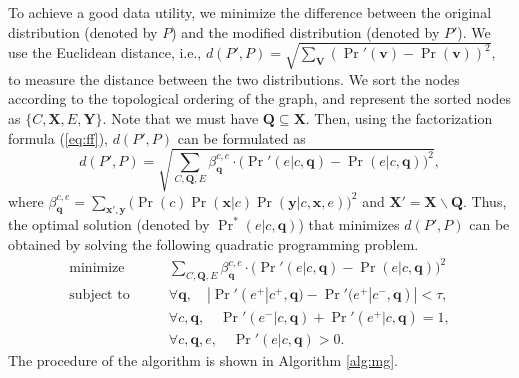 \documentclass[twoside,leqno,twocolumn]{article}
\begin{document}
To achieve a good data utility, we minimize the difference between the original distribution (denoted by $P$) and the modified distribution (denoted by $P'$). We use the Euclidean distance, i.e., $d(P',P)=\sqrt{\sum_{\mathbf{V}}({\Pr}'(\mathbf{v})-\Pr(\mathbf{v}))^{2}}$, to measure the distance between the two distributions. We sort the nodes according to the topological ordering of the graph, and represent the sorted nodes as $\{C,\mathbf{X},E,\mathbf{Y}\}$. Note that we must have $\mathbf{Q}\subseteq \mathbf{X}$. Then, using the factorization formula (\ref{eq:ff}), $d(P',P)$ can be formulated as
\begin{equation*}
d(P',P) = \sqrt{\sum_{C,\mathbf{Q},E} \beta_{\mathbf{q}}^{c,e} \cdot \big( {\Pr}'(e|c,\mathbf{q})-\Pr(e|c,\mathbf{q}) \big)^{2}},
\end{equation*}
where $\beta_{\mathbf{q}}^{c,e} = \sum_{\mathbf{x}',\mathbf{y}}\big( \Pr(c)\Pr(\mathbf{x}|c)\Pr(\mathbf{y}|c,\mathbf{x},e) \big)^{2}$ and $\mathbf{X}'=\mathbf{X}\backslash \mathbf{Q}$. Thus, the optimal solution (denoted by $\Pr^{*}(e|c,\mathbf{q})$) that minimizes $d(P',P)$ can be obtained by solving the following quadratic programming problem.
\begin{equation*}
\begin{split}
\textrm{minimize} & \qquad \sum_{C,\mathbf{Q},E} \beta_{\mathbf{q}}^{c,e} \cdot \big( {\Pr}'(e|c,\mathbf{q})-\Pr(e|c,\mathbf{q}) \big)^{2} \\
\textrm{subject to} & \qquad \forall \mathbf{q},\quad |{\Pr}'(e^{+}|c^{+},\mathbf{q})-{\Pr}'(e^{+}|c^{-},\mathbf{q})| < \tau, \\
& \qquad \forall c,\mathbf{q},\quad {\Pr}'(e^{-}|c,\mathbf{q})+{\Pr}'(e^{+}|c,\mathbf{q}) = 1, \\
& \qquad \forall c,\mathbf{q},e,\quad {\Pr}'(e|c,\mathbf{q}) > 0.
\end{split}
\end{equation*}
The procedure of the algorithm is shown in Algorithm \ref{alg:mg}.
\end{document}
